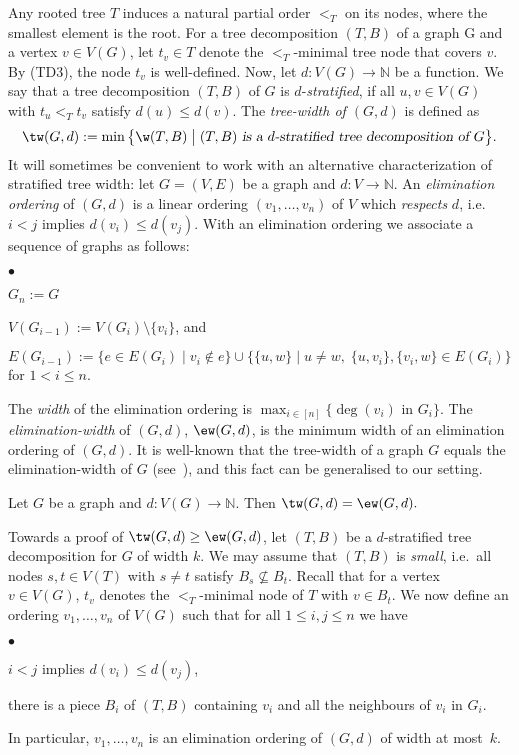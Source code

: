 \documentclass{LMCS}
\newcommand{\bigmid}{\;\big|\;}
\begin{document}
Any rooted tree $T$ induces a natural partial order $<_T$ on its nodes, where
the smallest element is the root. 
For a tree decomposition $(T,B)$ of a graph G and a vertex $v\in V(G)$, 
let $t_v\in T$ denote the $<_T$-minimal tree node that covers $v$. 
By (TD3), the node $t_v$ is well-defined. 
Now, let $d\colon V(G)\to\mathbb N$ be a function. 
We say that a tree decomposition $(T,B)$ of $G$ is $d$-\emph{stratified}, 
if all $u,v\in V(G)$
with $t_u<_T t_v$ satisfy $d(u)\leq d(v)$. 
The \emph{tree-width of $(G,d)$} is defined as
\[
 \tw(G,d):= \min\big\{\w(T,B)\bigmid
   \textsl{$(T,B)$ is a $d$-stratified tree decomposition of $G$}\big\}.
\]
It will sometimes be convenient to work 
with an alternative characterization of stratified tree width: 
let $G=(V,E)$ be a graph and $d:V\to\mathbb N$.
An \emph{elimination ordering} of $(G,d)$ 
is a linear ordering $(v_1,\ldots, v_n)$ of $V$ which \emph{respects} $d$, 
i.e.\ $i<j$ implies $d(v_i)\leq d(v_j)$.
With an elimination ordering we associate a sequence of graphs as follows: 
\begin{iteMize}{$\bullet$}
\item $G_n:=G$
\item $V(G_{i-1}):=V(G_i)\setminus \{v_i\}$, and
\item $E(G_{i-1}):=\big\{e\in E(G_i)\bigmid v_i\not\in e\big\} \cup
  \big\{\{u,w\}\bigmid u\neq w,\; \{u,v_i\},\{v_i,w\}\in E(G_i)\big\}$
for $1<i\le n$. 
\end{iteMize}
The \emph{width} of the elimination ordering is $\max_{i\in[n]}\{\deg(v_i)\text{ in }G_i\}$.
The \emph{elimination-width} of $(G,d)$, $\ew(G,d)$, is the minimum width of 
an elimination ordering of $(G,d)$. 
It is well-known that the tree-width of a graph $G$ equals the elimination-width of
$G$ (see~\cite{Arnborg85}), and this fact can be generalised to our setting.

\begin{thm}\label{theo:fotw-ew}
Let $G$ be a graph and $d:V(G)\to\mathbb N$.
Then $\tw(G,d)=\ew(G,d).$ 
\end{thm}


\proof
Towards a proof of $\tw(G,d)\geq\ew(G,d)$, let $(T,B)$ be a $d$-stratified
tree decomposition for $G$ of width $k$. We may assume that
$(T,B)$ is \emph{small}, i.e.~all nodes $s,t\in V(T)$ with $s\neq t$ satisfy
$B_s\not\subseteq B_t$. Recall that for a vertex $v\in V(G)$, 
$t_v$ denotes the $<_T$-minimal node of $T$ with $v\in B_t$.
We now define an ordering $v_1,\ldots,v_n$ of $V(G)$ 
such that for all $1\leq i,j\leq n$ we have
\begin{iteMize}{$\bullet$}
   \item $i<j$ implies $d(v_i)\leq d(v_j)$, 
	\item there is a piece $B_i$ of $(T,B)$
		containing $v_i$ and all the neighbours of $v_i$ in $G_i$. 
\end{iteMize}
In particular, $v_1,\ldots,v_n$ is an elimination ordering of $(G,d)$
of width at most~$k$.
\end{document}
